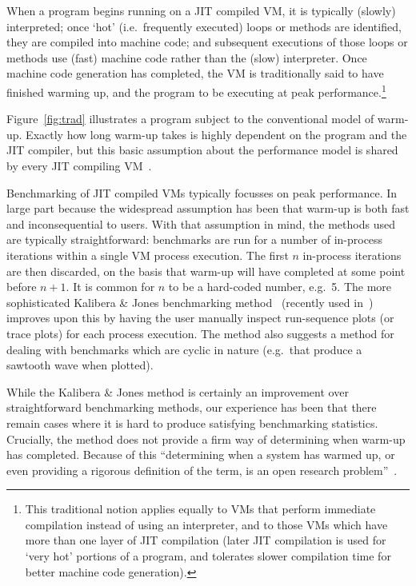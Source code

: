 \documentclass[preprint]{sigplanconf}
\newcommand{\kalibera}{Kalibera \& Jones\xspace}
\begin{document}
When a program begins running on a JIT compiled VM, it is typically (slowly)
interpreted; once `hot' (i.e.~frequently executed) loops or methods are
identified, they are compiled into machine code; and subsequent
executions of those loops or methods use (fast) machine code rather than the
(slow) interpreter. Once machine code generation has completed, the VM is
traditionally said to have finished warming up, and the program to be executing
at peak performance.\footnote{This traditional notion applies equally to VMs
that perform immediate compilation instead of using an interpreter, and to
those VMs which have more than one layer of JIT compilation (later JIT
compilation is used for `very hot' portions of a program, and tolerates slower
compilation time for better machine code generation).}

Figure~\ref{fig:trad} illustrates a
program subject to the conventional model of warm-up. Exactly how long warm-up
takes is highly dependent on
the program and the JIT compiler, but this basic assumption about the
performance model is shared by every JIT compiling
VM~\cite{kalibera13rigorous}.

Benchmarking of JIT compiled VMs typically focusses on peak
performance. In large part because the widespread assumption has been that
warm-up is both fast and inconsequential to users. With that assumption in mind, the
methods used are typically straightforward: benchmarks are run for a number
of in-process iterations within a single VM process execution.
The first $n$ in-process iterations are then discarded, on the basis that warm-up
will have completed at some point before $n+1$. It is common for
$n$ to be a hard-coded number, e.g.~5. The more sophisticated \kalibera
benchmarking method~\cite{kalibera12quantifying,kalibera13rigorous}
(recently used in~\cite{barrett15approaches,grimmer15dynamically}) improves
upon this by having the user manually inspect run-sequence plots (or trace
plots) for each process execution. The method also suggests a method for
dealing with benchmarks which are cyclic in nature (e.g.~that produce a
sawtooth wave when plotted).

While the \kalibera method is certainly an improvement over
straightforward benchmarking methods,
our experience has been that there remain cases where it is hard to produce
satisfying benchmarking statistics. Crucially, the method does not
provide a firm way of determining when warm-up has completed. Because of this
``determining when a system has warmed up, or even providing a
rigorous definition of the term, is an open research problem''~\cite{seaton15phd}.
\end{document}
